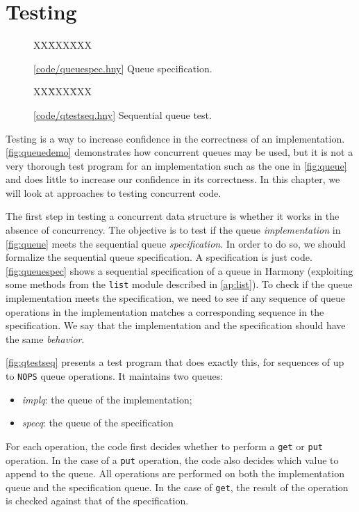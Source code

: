 \documentclass{report}
\newcommand{\harmonysource}[1]{
\begin{tabbing}
XX\=XXX\=XXX\kill
    
\end{tabbing}
}
\newcommand{\harmonylink}[1]{%
[\href{https://harmony.cs.cornell.edu/#1}{\underline{#1}}]%
}
\newenvironment{code}{
\tcolorbox
}{
\endtcolorbox
}
\begin{document}
\chapter{Testing}
\label{ch:testing}

\begin{figure}
\begin{code}
\harmonysource{queuespec}
\end{code}
\caption{\harmonylink{code/queuespec.hny} Queue specification.}
\label{fig:queuespec}
\end{figure}

\begin{figure}
\begin{code}
\harmonysource{qtestseq}
\end{code}
\caption{\harmonylink{code/qtestseq.hny} Sequential queue test.}
\label{fig:qtestseq}
\end{figure}

Testing is a way to increase confidence in the correctness
of an implementation.
\autoref{fig:queuedemo} demonstrates how concurrent queues
may be used, but it is not a very thorough test program
for an implementation such as the one in \autoref{fig:queue}
and does little to increase our confidence in its correctness.
In this chapter, we will look at approaches to testing
concurrent code.

The first step in testing a concurrent data structure is
whether it works in the absence of concurrency.
The objective is to test if the queue \emph{implementation}
in \autoref{fig:queue} meets the sequential
queue \emph{specification}.
In order to do so, we should formalize the sequential queue specification.
A specification is just code.
\autoref{fig:queuespec} shows a sequential specification of a
queue in Harmony (exploiting some methods from the \texttt{list}
module described in \autoref{ap:list}).
To check if the queue implementation meets the specification,
we need to see if any sequence of queue operations in the
implementation matches a corresponding sequence in the
specification.
We say that the implementation and the specification should
have the same \emph{behavior}.

\autoref{fig:qtestseq} presents a test program that does
exactly this, for sequences of up to \texttt{NOPS}
queue operations.
It maintains two queues:
\begin{itemize}
\item[] \textit{implq}: the queue of the implementation;
\item[] \textit{specq}: the queue of the specification
\end{itemize}
For each operation, the code first decides whether to
perform a \texttt{get} or \texttt{put} operation.
In the case of a \texttt{put} operation, the code also
decides which value to append to the queue.
All operations are performed on both the implementation
queue and the specification queue.
In the case of \texttt{get}, the result of the operation
is checked against that of the specification.
\end{document}
